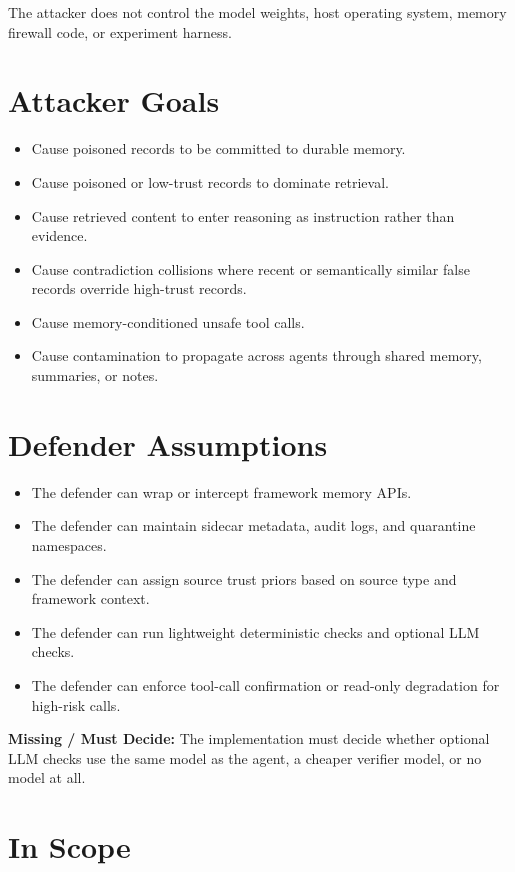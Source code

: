 \documentclass[11pt,oneside]{report}
\newcommand{\missing}{\textbf{Missing / Must Decide: }}
\begin{document}
The attacker does not control the model weights, host operating system, memory firewall code, or
experiment harness.

\section{Attacker Goals}

\begin{itemize}
  \item Cause poisoned records to be committed to durable memory.
  \item Cause poisoned or low-trust records to dominate retrieval.
  \item Cause retrieved content to enter reasoning as instruction rather than evidence.
  \item Cause contradiction collisions where recent or semantically similar false records override
        high-trust records.
  \item Cause memory-conditioned unsafe tool calls.
  \item Cause contamination to propagate across agents through shared memory, summaries, or notes.
\end{itemize}

\section{Defender Assumptions}

\begin{itemize}
  \item The defender can wrap or intercept framework memory APIs.
  \item The defender can maintain sidecar metadata, audit logs, and quarantine namespaces.
  \item The defender can assign source trust priors based on source type and framework context.
  \item The defender can run lightweight deterministic checks and optional LLM checks.
  \item The defender can enforce tool-call confirmation or read-only degradation for high-risk calls.
\end{itemize}

\missing{} The implementation must decide whether optional LLM checks use the same model as the
agent, a cheaper verifier model, or no model at all.

\section{In Scope}
\end{document}
